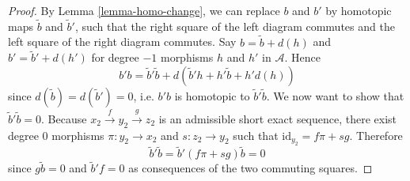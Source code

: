 \documentclass{stacks-project}
\theoremstyle{plain}
\theoremstyle{definition}
\theoremstyle{remark}
\numberwithin{equation}{subsection}
\begin{document}
\begin{proof}
By Lemma \ref{lemma-homo-change}, we can replace $b$ and $b'$
by homotopic maps $\tilde{b}$ and $\tilde{b}'$, such that the right
square of the left diagram commutes and the left square of the right
diagram commutes. Say $b = \tilde{b} + d(h)$ and $b'=\tilde{b}'+d(h')$
for degree $-1$ morphisms $h$ and $h'$ in $\mathcal{A}$. Hence
$$
b'b = \tilde{b}'\tilde{b} + d(\tilde{b}'h + h'\tilde{b} + h'd(h))
$$
since $d(\tilde{b})=d(\tilde{b}')=0$, i.e. $b'b$ is homotopic to
$\tilde{b}'\tilde{b}$. We now want to show that $\tilde{b}'\tilde{b}=0$.
Because $x_2\xrightarrow{f} y_2\xrightarrow{g} z_2$ is an admissible
short exact sequence, there exist degree $0$ morphisms
$\pi : y_2 \to x_2$ and $s : z_2 \to y_2$ such that
$\text{id}_{y_2} = f\pi + sg$. Therefore
$$
\tilde{b}'\tilde{b} = \tilde{b}'(f\pi + sg)\tilde{b} = 0
$$
since $g\tilde{b} = 0$ and $\tilde{b}'f = 0$ as consequences
of the two commuting squares.
\end{proof}
\end{document}
